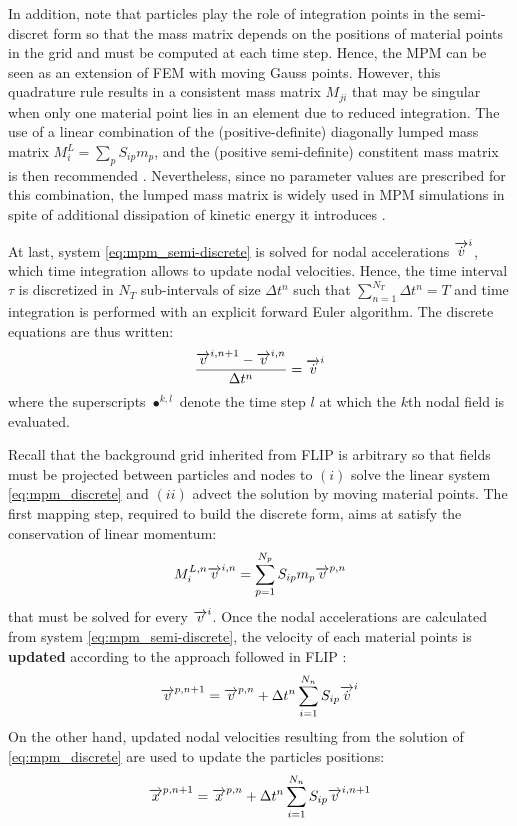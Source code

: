 In addition, note that particles play the role of integration points in the semi-discret form so that the mass matrix depends on the positions of material points in the grid and must be computed at each time step. Hence, the MPM can be seen as an extension of FEM with moving Gauss points. However, this quadrature rule results in a consistent mass matrix $M_{ji}$ that may be singular when only one material point lies in an element due to reduced integration. The use of a linear combination of the (positive-definite) diagonally lumped mass matrix $M^L_i=\sum_p S_{ip}m_p$, and the (positive semi-definite) constitent mass matrix is then recommended \cite{Love}. Nevertheless, since no parameter values are prescribed for this combination, the lumped mass matrix is widely used in MPM simulations in spite of additional dissipation of kinetic energy it introduces \cite{Mass_Flip}. 

At last, system \eqref{eq:mpm_semi-discrete} is solved for nodal accelerations ${\overrightarrow{\dot{v}}}^i$, which time integration allows to update nodal velocities. Hence, the time interval $\tau$ is discretized in $N_T$ sub-intervals of size $\Delta t^n$ such that $\sum_{n=1}^{N_T} \Delta t^n = T$ and time integration is performed with an explicit forward Euler algorithm. The discrete equations are thus written:
\begin{equation}
  \label{eq:mpm_discrete}
  \frac{{\overrightarrow{v}}^{i,n+1}-{\overrightarrow{v}}^{i,n}}{\Delta t^n} = {\overrightarrow{\dot{v}}}^i
\end{equation}
where the superscripts $\bullet^{k,l}$ denote the time step $l$ at which the $k$th nodal field is evaluated. 

Recall that the background grid inherited from FLIP is arbitrary so that fields must be projected between particles and nodes to $(i)$ solve the linear system \eqref{eq:mpm_discrete} and $(ii)$ advect the solution by moving material points. The first mapping step, required to build the discrete form, aims at satisfy the conservation of linear momentum:
\begin{equation}
  \label{eq:particles2nodes}
  M^{L,n}_i {\overrightarrow{v}}^{i,n} = \sum_{p=1}^{N_p} S_{ip}m_p {\overrightarrow{v}}^{p,n}
\end{equation}
that must be solved for every ${\overrightarrow{v}}^i$. Once the nodal accelerations are calculated from system \eqref{eq:mpm_semi-discrete}, the velocity of each material points is \textbf{updated} according to the approach followed in FLIP \cite{PIC_Nishiguchi}:
\begin{equation}
  \label{eq:mp_velocity_update}
  {\overrightarrow{v}}^{p,n+1}= {\overrightarrow{v}}^{p,n}+ \Delta t^n \sum_{i=1}^{N_n} S_{ip}{\overrightarrow{\dot{v}}}^{i}
\end{equation}
On the other hand, updated nodal velocities resulting from the solution of \eqref{eq:mpm_discrete} are used to update the particles positions:
\begin{equation}
  \label{eq:position_update}
  {\overrightarrow{x}}^{p,n+1}={\overrightarrow{x}}^{p,n} + \Delta t^n\sum_{i=1}^{N_n} S_{ip}{\overrightarrow{v}}^{i,n+1} 
\end{equation}


